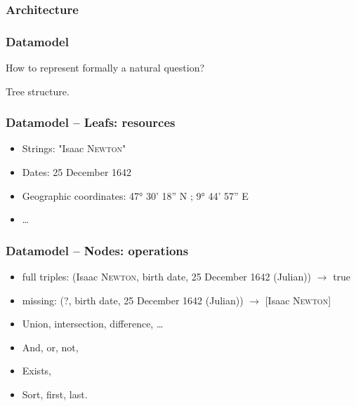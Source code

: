 \begin{frame}[fragile]
    \frametitle{Architecture}
    \begin{figure}
        \resizebox{.9\linewidth}{!}{
            
        }
    \end{figure}
\end{frame}

\begin{frame}[fragile]
    \frametitle{Datamodel}
    How to represent formally a natural question?

    Tree structure.
\end{frame}
\begin{frame}[fragile]
    \frametitle{Datamodel \--- Leafs: resources}
        \begin{itemize}
            \item Strings: "Isaac \textsc{Newton}"
            \item Dates: 25 December 1642
            \item Geographic coordinates: 47° 30' 18'' N ; 9° 44' 57'' E
            \item \ldots
        \end{itemize}
\end{frame}
\begin{frame}[fragile]
    \frametitle{Datamodel \--- Nodes: operations}
        \begin{itemize}
            \item full triples: (Isaac \textsc{Newton}, birth date, 25 December 1642 (Julian)) $\rightarrow$ true
            \item missing: (?, birth date, 25 December 1642 (Julian)) $\rightarrow$ [Isaac \textsc{Newton}]
            \item Union, intersection, difference, \ldots
            \item And, or, not,
            \item Exists,
            \item Sort, first, last.
        \end{itemize}
\end{frame}

